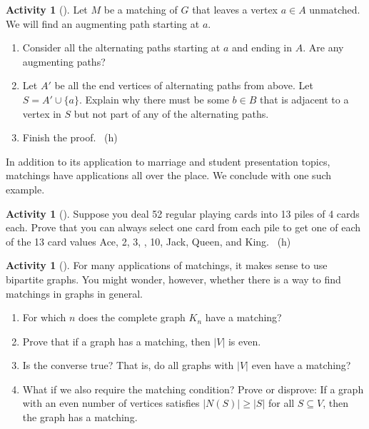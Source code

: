\documentclass[10pt,]{book}
\theoremstyle{plain}
\theoremstyle{definition}
\theoremstyle{definition}
\theoremstyle{definition}
\newtheorem{activity}[project]{Activity}
\numberwithin{equation}{chapter}
\newcommand{\card}[1]{\left| #1 \right|}
\begin{document}
\begin{activity}[]\label{activity-53}
\hypertarget{p-452}{}%
Let \(M\) be a matching of \(G\) that leaves a vertex \(a \in A\) unmatched.  We will find an augmenting path starting at \(a\).%
\begin{enumerate}[font=\bfseries,label=(\alph*),ref=\alph*]
\item\label{task-63} \hypertarget{p-453}{}%
Consider all the alternating paths starting at \(a\) and ending in \(A\).  Are any augmenting paths?%
\item\label{task-64} \hypertarget{p-454}{}%
Let \(A'\) be all the end vertices of alternating paths from above.  Let \(S = A' \cup \{a\}\).  Explain why there must be some \(b \in B\) that is adjacent to a vertex in \(S\) but not part of any of the alternating paths.%
\item\label{task-65} \hypertarget{p-455}{}%
Finish the proof.%
~{\tiny (h)}\end{enumerate}
\end{activity}
\hypertarget{p-457}{}%
In addition to its application to marriage and student presentation topics, matchings have applications all over the place. We conclude with one such example.%
\begin{activity}[]\label{activity-54}
\hypertarget{p-458}{}%
Suppose you deal 52 regular playing cards into 13 piles of 4 cards each. Prove that you can always select one card from each pile to get one of each of the 13 card values Ace, 2, 3, \textellipsis{}, 10, Jack, Queen, and King.%
~{\tiny (h)}\end{activity}
\begin{activity}[]\label{activity-55}
\hypertarget{p-462}{}%
For many applications of matchings, it makes sense to use bipartite graphs. You might wonder, however, whether there is a way to find matchings in graphs in general.%
\begin{enumerate}[font=\bfseries,label=(\alph*),ref=\alph*]
\item\label{task-66} \hypertarget{p-463}{}%
For which \(n\) does the complete graph \(K_n\) have a matching?%
\item\label{task-67} \hypertarget{p-464}{}%
Prove that if a graph has a matching, then \(\card{V}\) is even.%
\item\label{task-68} \hypertarget{p-465}{}%
Is the converse true?  That is, do all graphs with \(\card{V}\) even have a matching?%
\item\label{task-69} \hypertarget{p-466}{}%
What if we also require the matching condition?  Prove or disprove: If a graph with an even number of vertices satisfies \(\card{N(S)} \ge \card{S}\) for all \(S \subseteq V\), then the graph has a matching.%
\end{enumerate}
\end{activity}
\typeout{************************************************}
\typeout{************************************************}
\end{document}
